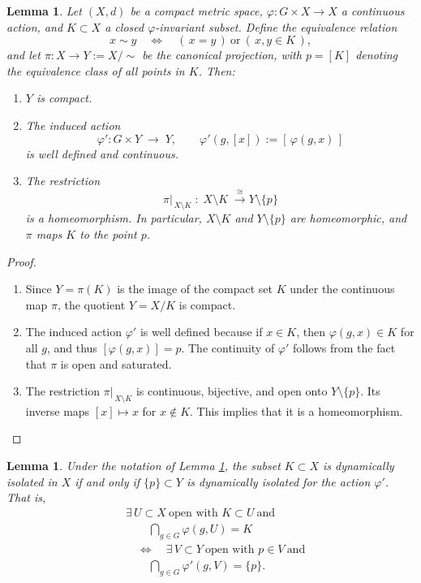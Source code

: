 \documentclass[12pt]{amsart}
\theoremstyle{plain}
\newtheorem{lemma}[theorem]{Lemma}
\theoremstyle{definition}
\theoremstyle{remark}
\begin{document}
\begin{lemma}\label{L:aislamiento-en-el-cociente}
Let \((X,d)\) be a compact metric space, \(\varphi\colon G\times X\to X\) a continuous action, and \(K\subset X\) a closed \(\varphi\)-invariant subset. Define the equivalence relation
\[
  x \sim y 
  \quad\Longleftrightarrow\quad 
  (\,x = y\,)\ \text{or}\ (\,x,y\in K\,),
\]
and let \(\pi\colon X\to Y := X/{\sim}\) be the canonical projection, with \(p = [K]\) denoting the equivalence class of all points in \(K\). Then:
\begin{enumerate}
  \item \(Y\) is compact.

  \item The induced action 
  \[
    \varphi'\colon G\times Y \;\longrightarrow\;Y,\qquad 
    \varphi'(g,[x]) := [\,\varphi(g,x)\,]
  \]
  is well defined and continuous.
  \item The restriction 
  \[
    \pi\bigl|_{\,X\setminus K}\;:\;X\setminus K \;\xrightarrow{\;\cong\;}Y\setminus\{p\}
  \]
  is a homeomorphism. In particular, \(X\setminus K\) and \(Y\setminus\{p\}\) are homeomorphic, and \(\pi\) maps \(K\) to the point \(p\).
\end{enumerate}
\end{lemma}

\begin{proof}
\begin{enumerate}
  \item Since \(Y=\pi(K)\) is the image of the compact set \(K\) under the continuous map \(\pi\), the quotient \(Y=X/K\) is compact.

  \item The induced action \(\varphi'\) is well defined because if \(x\in K\), then \(\varphi(g,x)\in K\) for all \(g\), and thus \([\varphi(g,x)] = p\). The continuity of \(\varphi'\) follows from the fact that \(\pi\) is open and saturated.
  \item The restriction \(\pi|_{\,X\setminus K}\) is continuous, bijective, and open onto \(Y\setminus\{p\}\). Its inverse maps \([x]\mapsto x\) for \(x\notin K\). This implies that it is a homeomorphism.
\end{enumerate}
\end{proof}


\begin{lemma}\label{L:aislamiento-dinamico}
Under the notation of Lemma \ref{L:aislamiento-en-el-cociente}, the subset \(K\subset X\) is dynamically isolated in \(X\) \emph{if and only if} \(\{p\}\subset Y\) is dynamically isolated for the action \(\varphi'\). That is,
\begin{align*}
&\exists\,U\subset X\ \text{open with }K\subset U \ \text{and}\\
&\qquad \bigcap_{g\in G} \varphi(g,U)=K\\[2pt]
&\quad\Longleftrightarrow\quad
\exists\,V\subset Y\ \text{open with }p\in V \ \text{and}\\
&\qquad \bigcap_{g\in G} \varphi'(g,V)=\{p\}.
\end{align*}

\end{lemma}
\end{document}
